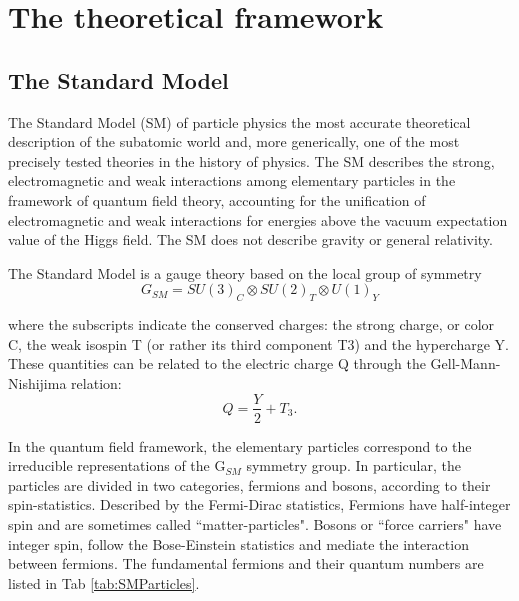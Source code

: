 \chapter{The theoretical framework}

\section{The Standard Model}
The Standard Model (SM) of particle physics the most accurate theoretical description of the subatomic world and, more generically, one of the most precisely tested theories in the history of physics.  The SM describes the strong, electromagnetic and weak interactions among  elementary particles in the framework of quantum field theory, accounting for the unification of electromagnetic and weak interactions for energies above the  vacuum expectation value of the Higgs field. The SM does not describe gravity or general relativity.

The Standard Model is a gauge theory based on the local group of symmetry
\begin{equation}
G_{SM} = SU(3)_C  \otimes SU(2)_T \otimes U(1)_Y
\label{eq:SMGroup}
\end{equation}

where the subscripts indicate the conserved charges: the strong charge, or color C, the weak isospin T (or rather its third component T3) and the hypercharge Y. These quantities can be related to the electric charge Q through the Gell-Mann-Nishijima relation:
\begin{equation}
Q = \frac{Y}{2} + T_3.
\end{equation}

In the quantum field framework, the elementary particles correspond to the irreducible representations of the G$_{SM}$ symmetry group. In particular, the particles are divided in two categories, fermions and bosons, according to their spin-statistics. Described by the Fermi-Dirac statistics, Fermions have half-integer spin and are sometimes called ``matter-particles". Bosons or ``force carriers" have integer spin, follow the Bose-Einstein statistics and mediate the interaction between fermions. The fundamental fermions and their quantum numbers are listed in Tab \ref{tab:SMParticles}.

